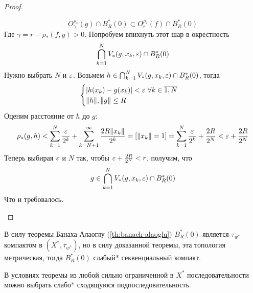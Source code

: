 \begin{proof}
\begin{enumerate}
		$$
		O_\gamma^{\rho_*}(g) \cap B_R^*(0) \subset O_r^{\rho_*}(f) \cap B_R^*(0)
		$$
		Где $\gamma = r - \rho_*(f,g) > 0$. Попробуем впихнуть этот шар в окрестность
		$$
		\bigcap_{k = 1}^N V_*(g, x_k, \varepsilon) \cap B_R^*(0)
		$$
		Нужно выбрать $N$ и $\varepsilon$. Возьмем $h \in \bigcap_{k = 1}^N V_*(g, x_k, \varepsilon) \cap B_R^*(0)$, тогда 
		$$
		\begin{cases}
			|h(x_k) - g(x_k)| < \varepsilon  \ \forall k \in \overline{1,N}\\
			\|h\|, \|g\| \leq R
		\end{cases}
		$$
		Оценим расстояние от $h$ до $g$:
		$$
		\rho_*(g,h) < \sum_{k=1}^N\frac{\varepsilon}{2^k} + \sum_{k = N+1}^\infty \frac{2R\|x_k\|}{2^k} = [\|x_k\| = 1] =  \sum_{k=1}^N\frac{\varepsilon}{2^k} + \frac{2R}{2^N} < \varepsilon + \frac{2R}{2^N}
		$$
		Теперь выбирая $\varepsilon$ и $N$ так, чтобы $ \varepsilon + \frac{2R}{2^N} < r$, получим, что 
		$$
		g \in \bigcap_{k = 1}^N V_*(g, x_k, \varepsilon) \cap B_R^*(0)
		$$
		Что и требовалось.
	\end{enumerate}
\end{proof}
\begin{next0}
	В силу теоремы Банаха-Алаоглу (\ref{th:banach-alaoglu}) $B_R^*(0)$ является $\tau_{w^*}$ компактом в $(X^*, \tau_{w^*})$, но в силу доказанной теоремы, эта топология метрическая, тогда $B_R^*(0)$ слабый* секвенциальный компакт.
\end{next0}
\begin{next0}
	В условиях теоремы из любой сильно ограниченной в $X^*$ последовательности можно выбрать слабо* сходящуюся подпоследовательность. 
\end{next0}